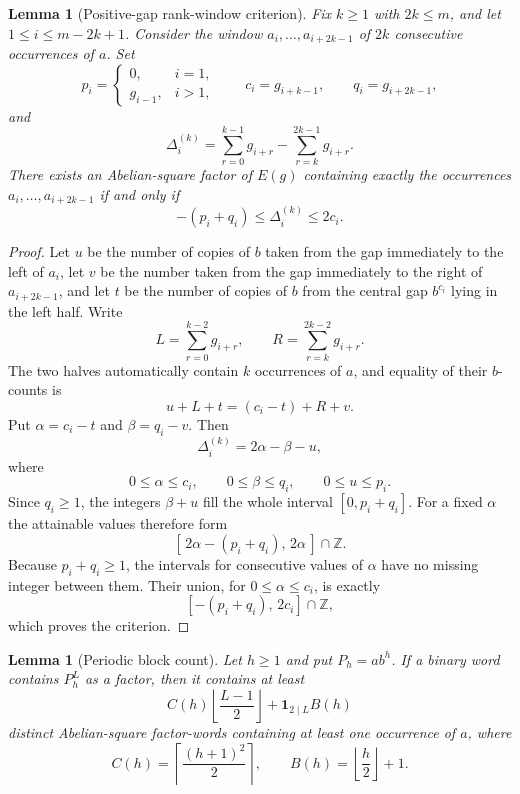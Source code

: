 \documentclass[11pt]{article}
\newtheorem{lemma}[theorem]{Lemma}
\theoremstyle{definition}
\begin{document}
\begin{lemma}[Positive-gap rank-window criterion]\label{lem:positive-rank-window}
Fix $k\ge1$ with $2k\le m$, and let $1\le i\le m-2k+1$.  Consider the window $a_i,\ldots,a_{i+2k-1}$ of $2k$ consecutive occurrences of $a$.  Set
\[
 p_i=\begin{cases}0,&i=1,\\ g_{i-1},&i>1,\end{cases}
 \qquad
 c_i=g_{i+k-1},
 \qquad
 q_i=g_{i+2k-1},
\]
and
\[
 \Delta_i^{(k)}
 =\sum_{r=0}^{k-1}g_{i+r}
  -\sum_{r=k}^{2k-1}g_{i+r}.
\]
There exists an Abelian-square factor of $E(g)$ containing exactly the occurrences $a_i,\ldots,a_{i+2k-1}$ if and only if
\[
 -(p_i+q_i)\le \Delta_i^{(k)}\le 2c_i.
\]
\end{lemma}

\begin{proof}
Let $u$ be the number of copies of $b$ taken from the gap immediately to the left of $a_i$, let $v$ be the number taken from the gap immediately to the right of $a_{i+2k-1}$, and let $t$ be the number of copies of $b$ from the central gap $b^{c_i}$ lying in the left half.  Write
\[
 L=\sum_{r=0}^{k-2}g_{i+r},
 \qquad
 R=\sum_{r=k}^{2k-2}g_{i+r}.
\]
The two halves automatically contain $k$ occurrences of $a$, and equality of their $b$-counts is
\[
 u+L+t=(c_i-t)+R+v.
\]
Put $\alpha=c_i-t$ and $\beta=q_i-v$.  Then
\[
 \Delta_i^{(k)}=2\alpha-\beta-u,
\]
where
\[
 0\le\alpha\le c_i,\qquad
 0\le\beta\le q_i,\qquad
 0\le u\le p_i.
\]
Since $q_i\ge1$, the integers $\beta+u$ fill the whole interval $[0,p_i+q_i]$.  For a fixed $\alpha$ the attainable values therefore form
\[
 [\,2\alpha-(p_i+q_i),\,2\alpha\,]\cap\mathbb Z.
\]
Because $p_i+q_i\ge1$, the intervals for consecutive values of $\alpha$ have no missing integer between them.  Their union, for $0\le\alpha\le c_i$, is exactly
\[
 [-(p_i+q_i),\,2c_i]\cap\mathbb Z,
\]
which proves the criterion.
\end{proof}

\begin{lemma}[Periodic block count]\label{lem:periodic-block-count}
Let $h\ge1$ and put $P_h=ab^h$.  If a binary word contains $P_h^L$ as a factor, then it contains at least
\[
 C(h)\left\lfloor\frac{L-1}{2}\right\rfloor
 +\mathbf 1_{2\mid L}B(h)
\]
distinct Abelian-square factor-words containing at least one occurrence of $a$, where
\[
 C(h)=\left\lceil\frac{(h+1)^2}{2}\right\rceil,
 \qquad
 B(h)=\left\lfloor\frac h2\right\rfloor+1.
\]
\end{lemma}
\end{document}
